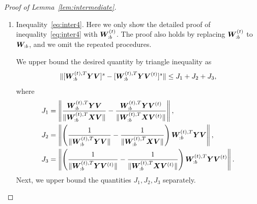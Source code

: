 \documentclass[lettersize,onecolumn,journal]{IEEEtran}
\theoremstyle{definition}
\theoremstyle{definition}
\newcommand{\of}[1]{\left(#1\right)}
\begin{document}
\begin{proof}[Proof of Lemma~\ref{lem:intermediate}]
\begin{enumerate}
    
    Therefore, combining the inequalities~\eqref{eq:i1}, \eqref{eq:i2}, and \eqref{eq:i3}, we finish the proof of inequality~\eqref{eq:inter3}.
    
    \item Inequality~\eqref{eq:inter4}. Here we only show the detailed proof of inequality~\eqref{eq:inter4} with $\bm{W}_{:b}^{(t)}$. The proof also holds by replacing $\bm{W}_{:b}^{(t)}$ to $\bm{W}_{:b}$, and we omit the repeated procedures.
    
    We upper bound the desired quantity by triangle inequality as
    \begin{equation}
         \lVert  [   \bm{W}_{:b}^{(t), T}  \bm Y \bm{V}]^s -  [  \bm{W}_{:b}^{(t), T}  \bm Y \bm{V}^{(t)}]^s \rVert  \leq J_1 + J_2 + J_3,
    \end{equation}
    where 
    \begin{align}
        J_1 &= \onorm{ \frac{\mW_{:b}^{(t),T} \mY \mV }{\onormSize{}{ \mW_{:b}^{(t),T} \mX \mV }} - \frac{\mW_{:b}^{(t),T} \mY \mV^{(t)} }{\onormSize{}{ \mW_{:b}^{(t),T} \mX \mV^{(t)} }}  },\\
        J_2 & = \onorm{\of{ \frac{1}{\onormSize{}{\mW_{:b}^{(t),T} \mY \mV}} -  \frac{1}{\onormSize{}{\mW_{:b}^{(t),T} \mX \mV}}  } \mW_{:b}^{(t),T} \mY \mV },\\
        J_3 &= \onorm{\of{ \frac{1}{\onormSize{}{\mW_{:b}^{(t),T} \mY \mV^{(t)}}} -  \frac{1}{\onormSize{}{\mW_{:b}^{(t),T} \mX \mV^{(t)}} }  } \mW_{:b}^{(t), T} \mY \mV^{(t)} }.
    \end{align}
    Next, we upper bound the quantities $J_1, J_2, J_3$ separately. 


\end{enumerate}
\end{proof}
\end{document}
